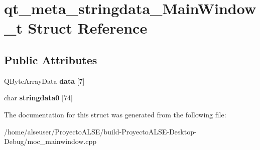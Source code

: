 \hypertarget{structqt__meta__stringdata___main_window__t}{}\section{qt\+\_\+meta\+\_\+stringdata\+\_\+\+Main\+Window\+\_\+t Struct Reference}
\label{structqt__meta__stringdata___main_window__t}
\subsection*{Public Attributes}
\begin{DoxyCompactItemize}
\item 
\mbox{\label{structqt__meta__stringdata___main_window__t_a70e55b3cae36e81c3bf1093c26a52b51}} 
Q\+Byte\+Array\+Data {\bfseries data} \mbox{[}7\mbox{]}
\item 
\mbox{\label{structqt__meta__stringdata___main_window__t_a1078a292ea0732d11f416555bca6f511}} 
char {\bfseries stringdata0} \mbox{[}74\mbox{]}
\end{DoxyCompactItemize}


The documentation for this struct was generated from the following file\+:\begin{DoxyCompactItemize}
\item 
/home/alseuser/\+Proyecto\+A\+L\+S\+E/build-\/\+Proyecto\+A\+L\+S\+E-\/\+Desktop-\/\+Debug/moc\+\_\+mainwindow.\+cpp\end{DoxyCompactItemize}
